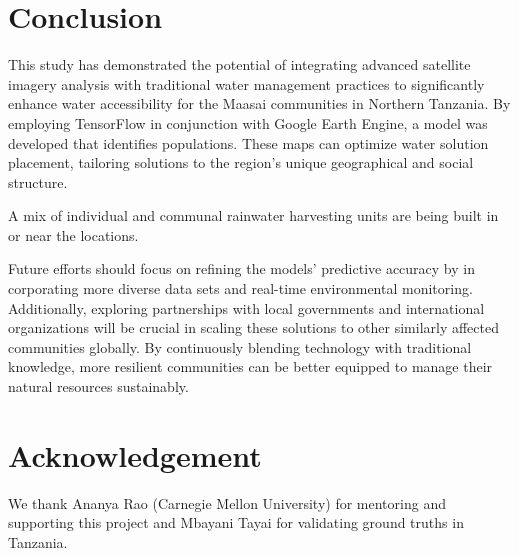 \documentclass[10pt]{article}
\begin{document}

\section{Conclusion}

This study has demonstrated the potential of integrating advanced satellite imagery analysis with traditional water management practices to significantly enhance water accessibility for the Maasai communities in Northern Tanzania. By employing TensorFlow in conjunction with Google Earth Engine, a model was developed that identifies populations. These maps can optimize water solution placement, tailoring solutions to the region's unique geographical and social structure.

A mix of individual and communal rainwater harvesting units are being built in or near the locations.

Future efforts should focus on refining the models' predictive accuracy by in corporating more diverse data sets and real-time environmental monitoring. Additionally, exploring partnerships with local governments and international organizations will be crucial in scaling these solutions to other similarly affected communities globally. By continuously blending technology with traditional knowledge, more resilient communities can be better equipped to manage their natural resources sustainably.

\section*{Acknowledgement}

We thank Ananya Rao (Carnegie Mellon University) for mentoring and supporting this project and Mbayani Tayai for validating ground truths in Tanzania.

\printbibliography
\end{document}
